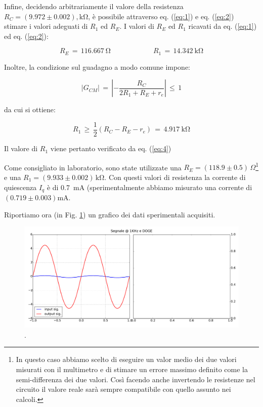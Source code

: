Infine, decidendo arbitrariamente il valore della resistenza $R_C=(9.972\pm0.002),\si{\kilo\ohm}$, è possibile attraverso eq. (\ref{eq:1}) e eq. (\ref{eq:2}) stimare i valori adeguati di $R_1$ ed $R_E$. 
I valori di $R_E$ ed $R_1$ ricavati da eq. (\ref{eq:1}) ed eq. (\ref{eq:2}):

$$R_E \, = \, \SI{116.667}{\ohm} \qquad \qquad \qquad R_1 \, = \, \SI{14.342}{\kilo\ohm}$$

\noindent Inoltre, la condizione sul guadagno a modo comune impone:

\begin{equation}
	\left| G_{CM} \right| \, = \, \left|  - \frac{R_C}{2 R_1 + R_E + r_e} \right| \, \leq \, 1
	\label{eq:4}
\end{equation}

da cui si ottiene:

$$	R_1 \, \geq \, \frac{1}{2} \left( R_C - R_E - r_e \right) \, = \, \SI{4.917}{\kilo\ohm}	$$

\noindent Il valore di $R_1$ viene pertanto verificato da eq. (\ref{eq:4})

Come consigliato in laboratorio, sono state utilizzate una $R_E=(118.9\pm0.5) \,\Omega$\footnote{In questo caso abbiamo scelto di eseguire un valor medio dei due valori misurati con il multimetro e di stimare un errore massimo definito come la semi-differenza dei due valori. Così facendo anche invertendo le resistenze nel circuito il valore reale sarà sempre compatibile con quello assunto nei calcoli.} e una $R_1= (9.933 \pm 0.002)\,\si{\kilo\ohm}$.
Con questi valori di resistenza la corrente di quiescenza $I_q$ è di \SI{0.7}{\milli\ampere} (sperimentalmente abbiamo misurato una corrente di $(0.719 \pm 0.003) \si{\milli\ampere}$.

Riportiamo ora (in Fig. \ref{fig:sig}) un grafico dei dati sperimentali acquisiti. 

\begin{figure}[h]
\centering
	\includegraphics[scale=0.425]{accontentati.pdf}
	\caption{.}
	\label{fig:sig}
\end{figure}

